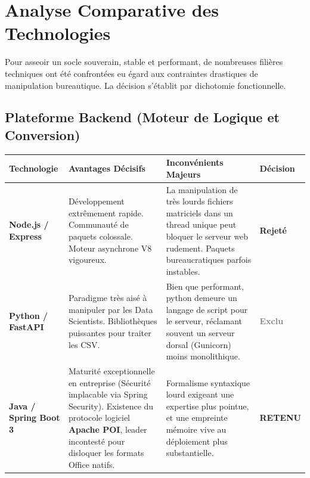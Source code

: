 \documentclass[12pt,a4paper,oneside]{report}
\begin{document}
\chapter{Analyse Comparative des Technologies}

Pour asseoir un socle souverain, stable et performant, de nombreuses filières techniques ont été confrontées eu égard aux contraintes drastiques de manipulation bureautique. La décision s'établit par dichotomie fonctionnelle.

\section{Plateforme Backend (Moteur de Logique et Conversion)}

\begin{table}[H]
\centering
\small
\begin{tabular}{L{3.5cm} L{4.5cm} L{4.5cm} L{2cm}}
\toprule
\textbf{Technologie} & \textbf{Avantages Décisifs} & \textbf{Inconvénients Majeurs} & \textbf{Décision} \\
\midrule
\textbf{Node.js / Express} & Développement extrêmement rapide. Communauté de paquets colossale. Moteur asynchrone V8 vigoureux. & La manipulation de très lourds fichiers matriciels dans un thread unique peut bloquer le serveur web rudement. Paquets bureaucratiques parfois instables. & \textcolor{red!80!black}{\textbf{Rejeté}} \\
\midrule
\textbf{Python / FastAPI} & Paradigme très aisé à manipuler par les Data Scientists. Bibliothèques puissantes pour traiter les CSV. & Bien que performant, python demeure un langage de script pour le serveur, réclamant souvent un serveur dorsal (Gunicorn) moins monolithique. & \textcolor{gray}{\textbf{Exclu}} \\
\midrule
\textbf{Java / Spring Boot 3} & Maturité exceptionnelle en entreprise (Sécurité implacable via Spring Security). Existence du protocole logiciel \textbf{Apache POI}, leader incontesté pour disloquer les formats Office natifs. & Formalisme syntaxique lourd exigeant une expertise plus pointue, et une empreinte mémoire vive au déploiement plus substantielle. & \textcolor{green!60!black}{\textbf{RETENU}} \\
\bottomrule
\end{tabular}
\end{table}
\end{document}
